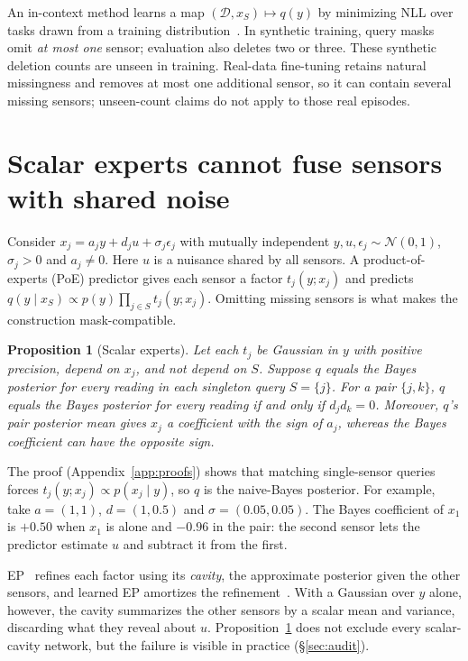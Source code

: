 \documentclass{article}
\newtheorem{proposition}{Proposition}
\newcommand{\N}{\mathcal{N}}
\newcommand{\D}{\mathcal{D}}
\begin{document}
An in-context method learns a map $(\D,x_S)\mapsto q(y)$ by minimizing NLL over tasks drawn from a training
distribution~\citep{garnelo2018cnp,muller2022pfn,gershman2014amortized}. In synthetic training, query masks omit
\emph{at most one} sensor; evaluation also deletes two or three. These synthetic deletion counts are unseen in
training. Real-data fine-tuning retains natural missingness and removes at most one additional sensor, so it can
contain several missing sensors; unseen-count claims do not apply to those real episodes.

\section{Scalar experts cannot fuse sensors with shared noise}
\label{sec:scalar}

Consider $x_j=a_j y+d_j u+\sigma_j\epsilon_j$ with mutually independent $y,u,\epsilon_j\sim\N(0,1)$, $\sigma_j>0$ and $a_j\neq0$. Here $u$ is
a nuisance shared by all sensors. A product-of-experts (PoE) predictor gives each sensor a factor $t_j(y;x_j)$ and
predicts $q(y\mid x_S)\propto p(y)\prod_{j\in S}t_j(y;x_j)$. Omitting missing sensors is what makes the construction
mask-compatible.

\begin{proposition}[Scalar experts]\label{prop:scalar}
Let each $t_j$ be Gaussian in $y$ with positive precision, depend on $x_j$, and not depend on $S$. Suppose $q$ equals
the Bayes posterior for every reading in each singleton query $S=\{j\}$. For a pair $\{j,k\}$, $q$ equals
the Bayes posterior for every reading if and only if $d_jd_k=0$. Moreover, $q$'s pair posterior mean gives $x_j$ a coefficient with the
sign of $a_j$, whereas the Bayes coefficient can have the opposite sign.
\end{proposition}

The proof (Appendix~\ref{app:proofs}) shows that matching single-sensor queries forces
$t_j(y;x_j)\propto p(x_j\mid y)$, so $q$ is the naive-Bayes posterior. For example, take $a=(1,1)$, $d=(1,0.5)$ and
$\sigma=(0.05,0.05)$. The Bayes coefficient of $x_1$ is $+0.50$ when $x_1$ is alone and $-0.96$ in the pair: the
second sensor lets the predictor estimate $u$ and subtract it from the first.

EP~\citep{minka2001ep} refines each factor using its \emph{cavity}, the approximate posterior given the other
sensors, and learned EP amortizes the refinement~\citep{heess2013learning,eslami2014just,jitkrittum2015kernel}. With a
Gaussian over $y$ alone, however, the cavity summarizes the other sensors by a scalar mean and variance, discarding
what they reveal about $u$. Proposition~\ref{prop:scalar} does not exclude every scalar-cavity network, but the
failure is visible in practice (\S\ref{sec:audit}).
\end{document}
